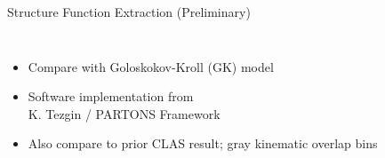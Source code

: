 \documentclass[aspectratio=169]{beamer}
\newcommand*{\myfont}{\fontfamily{lmtt}\selectfont}
\begin{document}
\begin{frame}{Structure Function Extraction (Preliminary)}
 \begin{columns}
        \begin{itemize}
                    \setlength\itemsep{1em}
                    \item \footnotesize Compare with Goloskokov-Kroll (GK) model %
                    {\myfont{\tiny [S.V. Goloskokov $\&$ P. Kroll, EPJC, 65,137 (2010)]}}

                    
                    \item Software implementation from\\
                    K. Tezgin / PARTONS Framework\\
                    {\myfont{\tiny [B. Berthou et al., EPJC, 78, 478 (2018)]}}

                    \item Also compare to prior CLAS result; gray kinematic overlap bins
                    \end{itemize}

                     
                    
\end{columns}
\end{frame}
\end{document}
